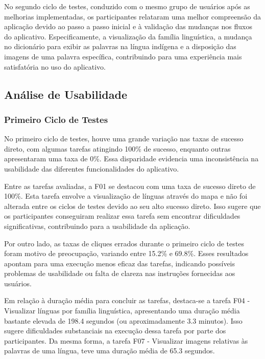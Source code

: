 No segundo ciclo de testes, conduzido com o mesmo grupo de usuários após as melhorias implementadas, os participantes relataram uma melhor compreensão da aplicação devido ao passo a passo inicial e à validação das mudanças nos fluxos do aplicativo. Especificamente, a visualização da 
família linguística, a mudança no dicionário para exibir as palavras na língua indígena e a disposição das imagens de uma palavra específica, contribuindo para uma experiência mais satisfatória no uso do aplicativo.

\subsection{Análise de Usabilidade}
\label{sec:Análise de Usabilidade}

\subsubsection{Primeiro Ciclo de Testes}
\label{sec:Primeiro Ciclo de Testes}

No primeiro ciclo de testes, houve uma grande variação nas taxas de sucesso direto, com algumas tarefas atingindo 100\% de sucesso, enquanto outras apresentaram uma taxa de 0\%. Essa disparidade evidencia uma inconsistência na usabilidade das diferentes funcionalidades do aplicativo.

Entre as tarefas avaliadas, a F01 se destacou com uma taxa de sucesso direto de 100\%. Esta tarefa envolve a visualização de línguas através do mapa e não foi alterada entre os ciclos de testes devido ao seu alto sucesso direto. Isso sugere que os participantes conseguiram realizar essa 
tarefa sem encontrar dificuldades significativas, contribuindo para a usabilidade da aplicação.

Por outro lado, as taxas de cliques errados durante o primeiro ciclo de testes foram motivo de preocupação, variando entre 15.2\% e 69.8\%. Esses resultados apontam para uma execução menos eficaz das tarefas, indicando possíveis problemas de usabilidade ou falta de clareza nas instruções 
fornecidas aos usuários.

Em relação à duração média para concluir as tarefas, destaca-se a tarefa F04 - Visualizar línguas por família linguística, apresentando uma duração média bastante elevada de 198.4 segundos (ou aproximadamente 3.3 minutos). Isso sugere dificuldades substanciais na execução 
dessa tarefa por parte dos participantes. Da mesma forma, a tarefa F07 - Visualizar imagens relativas às palavras de uma língua, teve uma duração média de 65.3 segundos.

